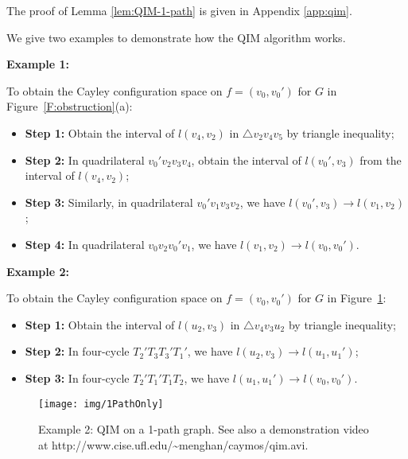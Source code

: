\documentclass[secthm,amsthm,english]{article}
\theoremstyle{definition}
\theoremstyle{remark}
\begin{document}
The proof of Lemma \ref{lem:QIM-1-path} is given in Appendix \ref{app:qim}. 

\smallskip

\noindent We give two examples to demonstrate how the QIM algorithm works. 

\noindent \textbf{Example 1: } 

To obtain the Cayley configuration space on $f=(v_{0},v_0')$ for $G$ in 
Figure~\ref{F:obstruction}(a): 


\begin{itemize}
\item \textbf{Step 1:} 
Obtain the interval of $l(v_{4},v_2)$ in $\triangle v_2v_{4}v_{5}$ by triangle inequality; 

\item \textbf{Step 2:} In quadrilateral $v_0'v_2v_3v_4$, obtain
the interval of $l(v_0',v_{3})$ from the interval of $l(v_{4},v_2)$;

\item \textbf{Step 3:} Similarly, in quadrilateral $v_0'v_{1}v_{3}v_2$, 
we have $l(v_0',v_{3}) \rightarrow l(v_1,v_2)$;

\item \textbf{Step 4:} In quadrilateral $v_0v_2v_0'v_1$, 
we have $l(v_1,v_2) \rightarrow l(v_0,v_0')$. 
\end{itemize}

\smallskip

\noindent \textbf{Example 2: } 

To obtain the Cayley configuration space on $f=(v_{0},v_0')$ for $G$ in 
Figure~\ref{F:1PathOnly}: 

\begin{itemize}
\item \textbf{Step 1:} 
Obtain the interval of $l(u_2,v_3)$ in $\triangle v_4v_{3}u_2$ by triangle inequality; 

\item \textbf{Step 2:} In four-cycle $T_2'T_3T_3'T_1'$,
we have $l(u_2,v_3) \rightarrow l(u_1,u_1')$; 

\item \textbf{Step 3:}  In four-cycle $T_2'T_1'T_1T_2$,
we have $l(u_1,u_1') \rightarrow l(v_0,v_0')$.  	
\end{itemize}



\begin{figure}[h]
	 
	      
	   
	   
	   
	
	\begin{centering}
	\texttt{[image: img/1PathOnly]} 
	\par\end{centering}
	
	\caption{ Example 2:  QIM on a 1-path graph. See also a demonstration video at http://www.cise.ufl.edu/\~{}menghan/caymos/qim.avi. }
\label{F:1PathOnly} 
\end{figure}
\end{document}

